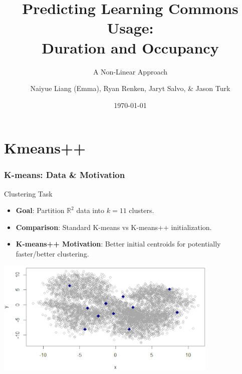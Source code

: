 \documentclass{beamer}
\title{Predicting Learning Commons Usage:\\Duration and Occupancy}
\subtitle{A Non-Linear Approach}
\author{Naiyue Liang (Emma), Ryan Renken, Jaryt Salvo, \& Jason Turk}
\institute{MATH 7560 Statistical Learning II \textbar\textbar \space BGSU}
\date{\today}
\begin{document}
\begin{frame}
\titlepage
\end{frame}


\section{Kmeans++}

\begin{frame}
\frametitle{K-means: Data \& Motivation}

    \begin{alertblock}{Clustering Task}
        \small %
        \begin{itemize}
            \item \textbf{Goal}: Partition \(\mathbb{R}^2\) data into \(k=11\) clusters.
            \item \textbf{Comparison}: Standard K-means vs K-means++ initialization.
            \item \textbf{K-means++ Motivation}: Better initial centroids for potentially faster/better clustering.
        \end{itemize}
    \end{alertblock}

    \vspace{0.5em} %
    \begin{center}
        \includegraphics[width=0.8\textwidth]{images/kmeans/kmeanscloud.png}
    \end{center}
\end{frame}
\end{document}
